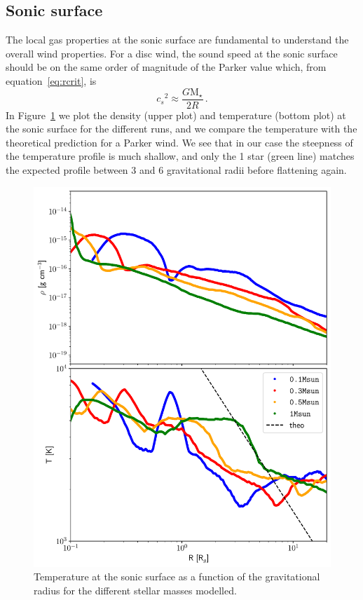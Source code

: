 \documentclass[usenatbib,useAMS,usedcolumn]{mnras}
\begin{document}
\subsection{Sonic surface}
The local gas properties at the sonic surface are fundamental to understand the overall wind properties.
For a disc wind, the sound speed at the sonic surface should be on the same order of magnitude of the Parker value which, from equation~\ref{eq:rcrit}, is
\begin{equation}
    {c_s}^2 \approx \frac{G \mathrm{M}_\star}{2R}\,.
\end{equation}
In Figure~\ref{fig:sonicsurf} we plot the density (upper plot) and temperature (bottom plot) at the sonic surface for the different runs, and we compare the temperature with the theoretical prediction for a Parker wind.
We see that in our case the steepness of the temperature profile is much shallow, and only the \SI{1}{\solarmass} star (green line) matches the expected profile between $3$ and $6$ gravitational radii before flattening again.
\begin{figure}
    \centering
    \includegraphics[width=\columnwidth]{Figure9}
    \caption{Temperature at the sonic surface as a function of the gravitational radius for the different stellar masses modelled. \label{fig:sonicsurf}}
\end{figure}
\end{document}
